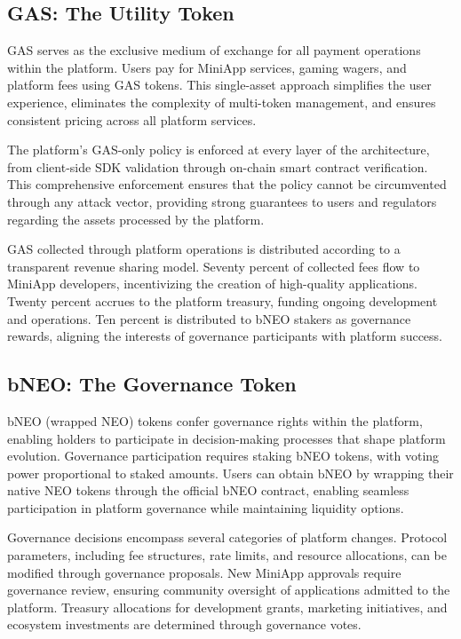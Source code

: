 \documentclass[11pt,a4paper]{article}
\begin{document}
\subsection{GAS: The Utility Token}

GAS serves as the exclusive medium of exchange for all payment operations within the platform. Users pay for MiniApp services, gaming wagers, and platform fees using GAS tokens. This single-asset approach simplifies the user experience, eliminates the complexity of multi-token management, and ensures consistent pricing across all platform services.

The platform's GAS-only policy is enforced at every layer of the architecture, from client-side SDK validation through on-chain smart contract verification. This comprehensive enforcement ensures that the policy cannot be circumvented through any attack vector, providing strong guarantees to users and regulators regarding the assets processed by the platform.

GAS collected through platform operations is distributed according to a transparent revenue sharing model. Seventy percent of collected fees flow to MiniApp developers, incentivizing the creation of high-quality applications. Twenty percent accrues to the platform treasury, funding ongoing development and operations. Ten percent is distributed to bNEO stakers as governance rewards, aligning the interests of governance participants with platform success.

\subsection{bNEO: The Governance Token}

bNEO (wrapped NEO) tokens confer governance rights within the platform, enabling holders to participate in decision-making processes that shape platform evolution. Governance participation requires staking bNEO tokens, with voting power proportional to staked amounts. Users can obtain bNEO by wrapping their native NEO tokens through the official bNEO contract, enabling seamless participation in platform governance while maintaining liquidity options.

Governance decisions encompass several categories of platform changes. Protocol parameters, including fee structures, rate limits, and resource allocations, can be modified through governance proposals. New MiniApp approvals require governance review, ensuring community oversight of applications admitted to the platform. Treasury allocations for development grants, marketing initiatives, and ecosystem investments are determined through governance votes.
\end{document}
